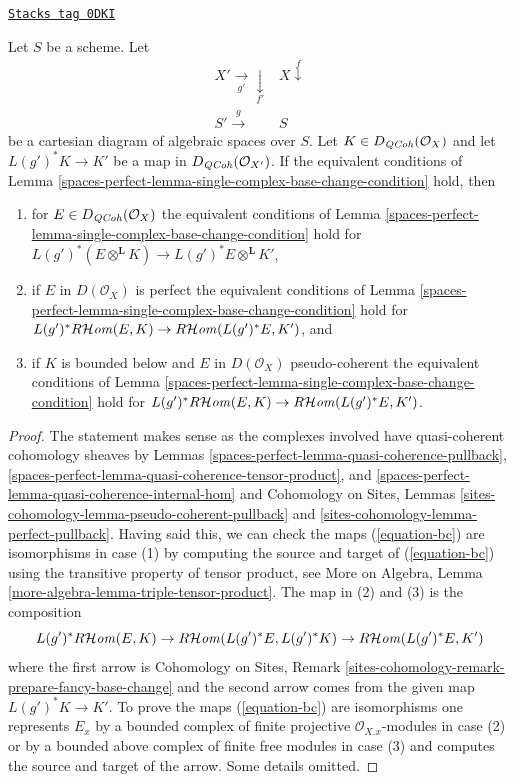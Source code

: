 \begin{lemma}
\label{spaces-perfect-lemma-single-complex-base-change-condition-inherited}
\href{https://stacks.math.columbia.edu/tag/0DKI}{\texttt{Stacks tag 0DKI}}

Let $S$ be a scheme. Let
$$
\begin{array}{cc}X' \underset{g'}{\longrightarrow}\underset{f'}{\downarrow} & X \overset{f}{\downarrow} \\ S' \overset{g}{\longrightarrow} & S\end{array}
$$
be a cartesian diagram of algebraic spaces over $S$.
Let $K \in D_{\mathit{QCoh}}(\mathcal{O}_X)$ and let $L(g')^*K \to K'$
be a map in $D_{\mathit{QCoh}}(\mathcal{O}_{X'})$. If the equivalent conditions of
Lemma \ref{spaces-perfect-lemma-single-complex-base-change-condition} hold, then
\begin{enumerate}
\item for $E \in D_{\mathit{QCoh}}(\mathcal{O}_X)$ the equivalent
conditions of Lemma \ref{spaces-perfect-lemma-single-complex-base-change-condition} hold
for $L(g')^*(E \otimes^\mathbf{L} K) \to L(g')^*E \otimes^\mathbf{L} K'$,
\item if $E$ in $D(\mathcal{O}_X)$ is perfect the equivalent conditions of
Lemma \ref{spaces-perfect-lemma-single-complex-base-change-condition} hold for
$L(g')^*R\mathcal{H}\mathit{om}(E, K) \to R\mathcal{H}\mathit{om}(L(g')^*E, K')$, and
\item if $K$ is bounded below and $E$ in $D(\mathcal{O}_X)$
pseudo-coherent the equivalent conditions of
Lemma \ref{spaces-perfect-lemma-single-complex-base-change-condition} hold for
$L(g')^*R\mathcal{H}\mathit{om}(E, K) \to R\mathcal{H}\mathit{om}(L(g')^*E, K')$.
\end{enumerate}
\end{lemma}

\begin{proof}
The statement makes sense as the complexes involved have quasi-coherent
cohomology sheaves by Lemmas
\ref{spaces-perfect-lemma-quasi-coherence-pullback},
\ref{spaces-perfect-lemma-quasi-coherence-tensor-product}, and
\ref{spaces-perfect-lemma-quasi-coherence-internal-hom} and
Cohomology on Sites, Lemmas
\ref{sites-cohomology-lemma-pseudo-coherent-pullback} and
\ref{sites-cohomology-lemma-perfect-pullback}.
Having said this, we can check the maps (\ref{equation-bc})
are isomorphisms in case (1) by computing the source and target
of (\ref{equation-bc}) using the transitive property of tensor product, see
More on Algebra, Lemma \ref{more-algebra-lemma-triple-tensor-product}.
The map in (2) and (3) is the composition
$$
L(g')^*R\mathcal{H}\mathit{om}(E, K) \to R\mathcal{H}\mathit{om}(L(g')^*E, L(g')^*K)
\to R\mathcal{H}\mathit{om}(L(g')^*E, K')
$$
where the first arrow is
Cohomology on Sites, Remark
\ref{sites-cohomology-remark-prepare-fancy-base-change}
and the second arrow comes from the given map $L(g')^*K \to K'$.
To prove the maps (\ref{equation-bc}) are isomorphisms one represents
$E_x$ by a bounded complex of finite projective $\mathcal{O}_{X. x}$-modules
in case (2) or by a bounded above complex of finite free modules in case (3)
and computes the source and target of the arrow.
Some details omitted.
\end{proof}

